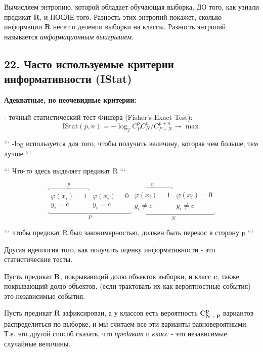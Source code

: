 Вычисляем энтропию, которой обладает обучающая выборка, ДО того, как узнали
предикат $\mathbf{R}$, и ПОСЛЕ того.
Разность этих энтропий покажет, сколько информации $\mathbf{R}$ несет о
делении выборки на классы.
Разность энтропий называется \textit{информационным выигрышем}.

\subsection{22. Часто используемые критерии информативности (IStat)}

\textbf{Адекватные, но неочевидные критерии:}

- точный статистический тест Фишера (Fisher's Exact Test):
$$
\text{IStat}{\left( p, n \right)} =
-\log_2{C^p_P C^n_N / C^{p+n}_{P+N}} \rightarrow \max
$$

```
-log используется для того, чтобы получить величину, которая чем больше, тем
лучше
```

```
Что-то здесь выделяет предикат R
```

$$
\underbrace{
{\overbrace{
\boxed{\begin{matrix}
\varphi{( x_i )} = 1 \\
y_i = c
\end{matrix}}
}^{p}}
\boxed{\begin{matrix}
\varphi{( x_i )} = 0 \\
y_i = c
\end{matrix}}
}_{P}
\underbrace{
{\overbrace{
\boxed{\begin{matrix}
\varphi{( x_i )} = 1 \\
y_i \neq c
\end{matrix}}
}^{n}}
\boxed{\begin{matrix}
\varphi{( x_i )} = 0 \\
y_i \neq c
\end{matrix}}
}_{N}
$$

```
чтобы предикат R был закономерностью, должен быть перекос в сторону p
```

Другая идеология того, как получить оценку информативности - это
статистические тесты.

Пусть предикат $\mathbf{R}$, покрывающий долю объектов выборки, и класс
$\mathbf{c}$, также покрывающий долю объектов, (если трактовать их как
вероятностные события) - это независимые события.

Пусть предикат $\mathbf{R}$ зафиксирован, а у классов есть вероятность
$\mathbf{C^p_{N+P}}$ вариантов распределиться по выборке, и мы считаем все
эти варианты равновероятными.
Т.е. это другой способ сказать, что \textit{предикат} и \textit{класс} - это независимые
случайные величины.

